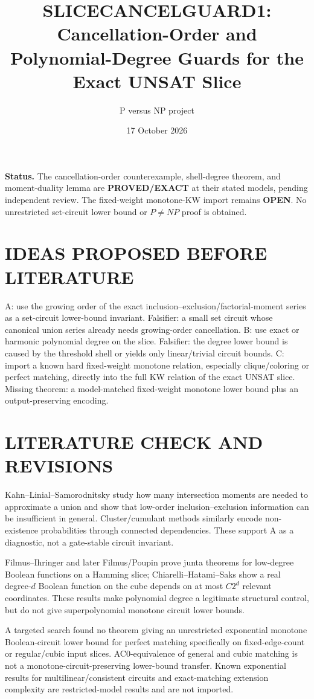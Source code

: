 \documentclass[11pt]{article}
\title{SLICECANCELGUARD1: Cancellation-Order and Polynomial-Degree Guards for the Exact UNSAT Slice}
\author{P versus NP project}
\date{17 October 2026}
\begin{document}
\maketitle
\noindent\textbf{Status.} The cancellation-order counterexample, shell-degree theorem, and moment-duality lemma are \textbf{PROVED/EXACT} at their stated models, pending independent review. The fixed-weight monotone-KW import remains \textbf{OPEN}. No unrestricted set-circuit lower bound or $P\ne NP$ proof is obtained.

\section{IDEAS PROPOSED BEFORE LITERATURE}
A: use the growing order of the exact inclusion--exclusion/factorial-moment series as a set-circuit lower-bound invariant. Falsifier: a small set circuit whose canonical union series already needs growing-order cancellation. B: use exact or harmonic polynomial degree on the slice. Falsifier: the degree lower bound is caused by the threshold shell or yields only linear/trivial circuit bounds. C: import a known hard fixed-weight monotone relation, especially clique/coloring or perfect matching, directly into the full KW relation of the exact UNSAT slice. Missing theorem: a model-matched fixed-weight monotone lower bound plus an output-preserving encoding.

\section{LITERATURE CHECK AND REVISIONS}
Kahn--Linial--Samorodnitsky study how many intersection moments are needed to approximate a union and show that low-order inclusion--exclusion information can be insufficient in general. Cluster/cumulant methods similarly encode non-existence probabilities through connected dependencies. These support A as a diagnostic, not a gate-stable circuit invariant.

Filmus--Ihringer and later Filmus/Poupin prove junta theorems for low-degree Boolean functions on a Hamming slice; Chiarelli--Hatami--Saks show a real degree-$d$ Boolean function on the cube depends on at most $C2^d$ relevant coordinates. These results make polynomial degree a legitimate structural control, but do not give superpolynomial monotone circuit lower bounds.

A targeted search found no theorem giving an unrestricted exponential monotone Boolean-circuit lower bound for perfect matching specifically on fixed-edge-count or regular/cubic input slices. AC0-equivalence of general and cubic matching is not a monotone-circuit-preserving lower-bound transfer. Known exponential results for multilinear/consistent circuits and exact-matching extension complexity are restricted-model results and are not imported.
\end{document}
